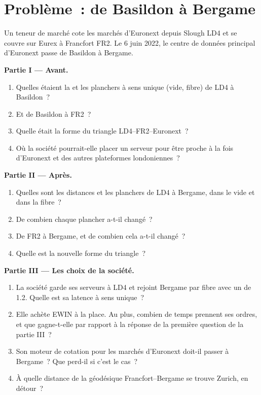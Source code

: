 \section{Problème~: de Basildon à Bergame}

\begin{problem}\label{pb:nw:the-european-map:1}
Un teneur de marché cote les marchés d'Euronext depuis Slough LD4 et se couvre sur Eurex à Francfort FR2. Le 6 juin 2022, le centre de données principal d'Euronext
passe de Basildon à Bergame.

\medskip\noindent\textbf{Partie I --- Avant.}
\begin{enumerate}
\item Quelles étaient la  et les planchers à sens unique (vide, fibre) de LD4 à Basildon~?
\item Et de Basildon à FR2~?
\item Quelle était la forme du triangle LD4--FR2--Euronext~?
\item Où la société pourrait-elle placer un serveur pour être proche à la fois d'Euronext et des autres plateformes londoniennes~?
\end{enumerate}

\medskip\noindent\textbf{Partie II --- Après.}
\begin{enumerate}[resume]
\item Quelles sont les distances et les planchers de LD4 à Bergame, dans le vide et dans la fibre~?
\item De combien chaque plancher a-t-il changé~?
\item De FR2 à Bergame, et de combien cela a-t-il changé~?
\item Quelle est la nouvelle forme du triangle~?
\end{enumerate}

\medskip\noindent\textbf{Partie III --- Les choix de la société.}
\begin{enumerate}[resume]
\item La société garde ses serveurs à LD4 et rejoint Bergame par fibre avec un  de 1.2. Quelle est sa latence à sens unique~?
\item Elle achète EWIN à la place. Au plus, combien de temps prennent ses ordres, et que gagne-t-elle par rapport à la réponse de la première question de la partie III~?
\item Son moteur de cotation pour les marchés d'Euronext doit-il passer à Bergame~? Que perd-il si c'est le cas~?
\item À quelle distance de la géodésique Francfort--Bergame se trouve Zurich, en détour~?
\end{enumerate}


\end{problem}
